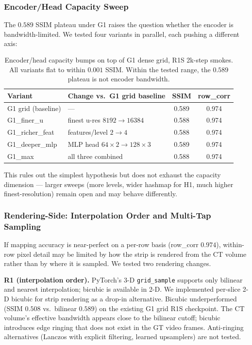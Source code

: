 \documentclass[11pt,a4paper]{article}
\begin{document}
\subsubsection{Encoder/Head Capacity Sweep}

The $0.589$ SSIM plateau under G1 raises the question whether the encoder is bandwidth-limited. We tested four variants in parallel, each pushing a different axis:

\begin{table}[H]
\centering
\begin{tabular}{llcc}
\toprule
Variant & Change vs.\ G1 grid baseline & SSIM & row\_corr \\
\midrule
G1 grid (baseline) & --- & 0.589 & 0.974 \\
G1\_finer\_u    & finest u-res $8192 \to 16384$    & 0.588 & 0.974 \\
G1\_richer\_feat & features/level $2 \to 4$         & 0.588 & 0.974 \\
G1\_deeper\_mlp & MLP head $64\times 2 \to 128\times 3$ & 0.589 & 0.974 \\
G1\_max         & all three combined                & 0.588 & 0.974 \\
\bottomrule
\end{tabular}
\caption{Encoder/head capacity bumps on top of G1 dense grid, R1S 2k-step smokes. All variants flat to within $0.001$ SSIM. Within the tested range, the $0.589$ plateau is not encoder bandwidth.}
\label{tab:phase5_capacity}
\end{table}

This rules out the simplest hypothesis but does not exhaust the capacity dimension --- larger sweeps (more levels, wider hashmap for H1, much higher finest-resolution) remain open and may behave differently.

\subsubsection{Rendering-Side: Interpolation Order and Multi-Tap Sampling}

If mapping accuracy is near-perfect on a per-row basis (row\_corr $0.974$), within-row pixel detail may be limited by how the strip is rendered from the CT volume rather than by where it is sampled. We tested two rendering changes.

\textbf{R1 (interpolation order).} PyTorch's 3-D \texttt{grid\_sample} supports only bilinear and nearest interpolation; bicubic is available in 2-D. We implemented per-slice 2-D bicubic for strip rendering as a drop-in alternative. Bicubic underperformed (SSIM $0.508$ vs.\ bilinear $0.589$) on the existing G1 grid R1S checkpoint. The CT volume's effective bandwidth appears close to the bilinear cutoff; bicubic introduces edge ringing that does not exist in the GT video frames. Anti-ringing alternatives (Lanczos with explicit filtering, learned upsamplers) are not tested.
\end{document}
